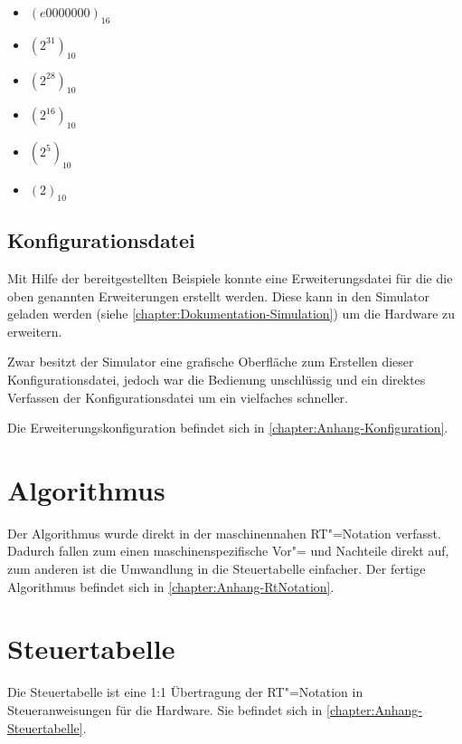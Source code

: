 \begin{itemize}
    \item $(e0000000)_{16}$
    \item $(2^{31})_{10}$
    \item $(2^{28})_{10}$
    \item $(2^{16})_{10}$
    \item $(2^5)_{10}$
    \item $(2)_{10}$
\end{itemize}

\subsection{Konfigurationsdatei}
\label{subsection:Dokumentation-Implementierung-Hardwareerweiterung-Konfigurationsdatei}

Mit Hilfe der bereitgestellten Beispiele konnte eine Erweiterungsdatei für die die oben genannten Erweiterungen erstellt werden. Diese kann in den Simulator geladen werden (siehe \autoref{chapter:Dokumentation-Simulation}) um die Hardware zu erweitern.

Zwar besitzt der Simulator eine grafische Oberfläche zum Erstellen dieser Konfigurationsdatei, jedoch war die Bedienung unschlüssig und ein direktes Verfassen der Konfigurationsdatei um ein vielfaches schneller.

Die Erweiterungskonfiguration befindet sich in \autoref{chapter:Anhang-Konfiguration}.

\section{Algorithmus}
\label{section:Dokumentation-Implementierung-Algorithmus}

Der Algorithmus wurde direkt in der maschinennahen RT"=Notation verfasst. Dadurch fallen zum einen maschinenspezifische Vor"= und Nachteile direkt auf, zum anderen ist die Umwandlung in die Steuertabelle einfacher. Der fertige Algorithmus befindet sich in \autoref{chapter:Anhang-RtNotation}.

\section{Steuertabelle}
\label{section:Dokumentation-Implementierung-Steuertabelle}

Die Steuertabelle ist eine 1:1 Übertragung der RT"=Notation in Steueranweisungen für die Hardware. Sie befindet sich in \autoref{chapter:Anhang-Steuertabelle}.
